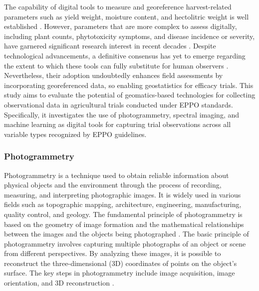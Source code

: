 \documentclass[12pt,a4paper,oneside]{report}
\begin{document}
The capability of digital tools to measure and georeference harvest-related 
parameters such as yield weight, moisture content, and hectolitric weight 
is well established \cite{cisternas_systematic_2020,zhao_grain_2011,mahleinHyperspectralSensorsImaging2018}. However, parameters that are more complex to assess 
digitally, including plant counts, phytotoxicity symptoms, and disease 
incidence or severity, have garnered significant research interest in 
recent decades \cite{bockSpecialIssuePhytopathometry2022,bockVisualEstimatesFully2020,bockPlantDiseaseSeverity2010,mahleinHyperspectralSensorsImaging2018}. 
Despite technological advancements, a definitive consensus has yet to emerge 
regarding the extent to which these tools can fully substitute for human 
observers \cite{barbedoAutomaticMethodDetect2014,bockVisualEstimatesFully2020,arnalbarbedoDigitalImageProcessing2013}. Nevertheless, their adoption undoubtedly enhances field assessments 
by incorporating georeferenced data, so enabling
geostatistics for efficacy trials.
This study aims to evaluate the potential of geomatics-based technologies for 
collecting observational data in agricultural trials conducted under EPPO 
standards. Specifically, it investigates the use of photogrammetry, 
spectral imaging, and machine learning as digital tools for capturing trial 
observations across all variable types recognized by EPPO guidelines.

\subsubsection{Photogrammetry}

Photogrammetry is a technique used to obtain reliable information about physical 
objects and the environment through the process of recording, measuring, and interpreting 
photographic images. It is widely used in various fields such as topographic mapping, 
architecture, engineering, manufacturing, quality control, and geology. The fundamental 
principle of photogrammetry is based on the geometry of image formation and the 
mathematical relationships between the images and the objects being photographed
\cite{hartleyMultipleViewGeometry2003,krausPhotogrammetryGeometryImages2007}.
The basic principle of photogrammetry involves capturing multiple photographs of 
an object or scene from different perspectives. By analyzing these images, it is 
possible to reconstruct the three-dimensional (3D) coordinates of points on the 
object's surface. The key steps in photogrammetry include image acquisition, image 
orientation, and 3D reconstruction
\cite{hartleyMultipleViewGeometry2003,szeliskiComputerVisionAlgorithms2022}.
\end{document}
